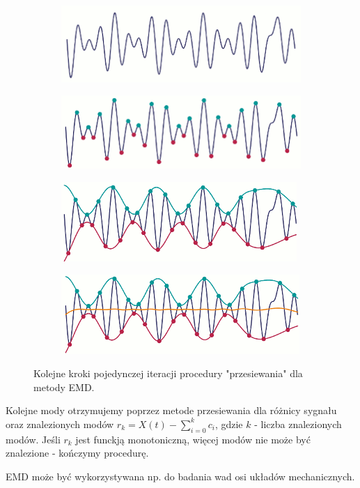 \begin{figure} [H]
	\centering
	\begin{subfigure}{.48\textwidth}
		\centering
		\includegraphics[width=1.0\linewidth]{EDMIIssues/Figures/emd1.png}
	\end{subfigure}
	\begin{subfigure}{.48\textwidth}
		\centering
		\includegraphics[width=1.0\linewidth]{EDMIIssues/Figures/emd2.png}
	\end{subfigure}
	\begin{subfigure}{.48\textwidth}
		\centering
		\includegraphics[width=1.0\linewidth]{EDMIIssues/Figures/emd3.png}
	\end{subfigure}
	\begin{subfigure}{.48\textwidth}
		\centering
		\includegraphics[width=1.0\linewidth]{EDMIIssues/Figures/emd4.png}
	\end{subfigure}
	\caption{Kolejne kroki pojedynczej iteracji procedury "przesiewania" dla metody EMD.}
	\label{emd}
\end{figure}

Kolejne mody otrzymujemy poprzez metode przesiewania dla różnicy sygnału oraz znalezionych modów $ r_{k} = X(t) - \sum_{i=0}^{k} c_i $, gdzie $ k $ - liczba znalezionych modów. Jeśli $ r_k $ jest funckją monotoniczną, więcej modów nie może być znalezione - kończymy procedurę.

EMD może być wykorzystywana np. do badania wad osi układów mechanicznych.